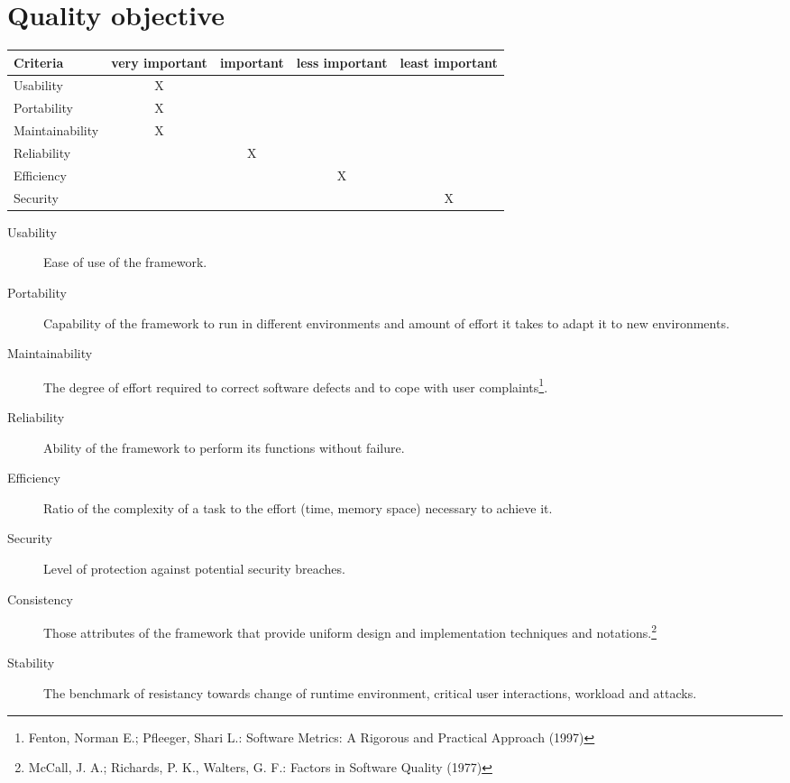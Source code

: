 \section{Quality objective}

\begin{tabular}{lcccc}
\hline
\textbf{Criteria} & \textbf{very important} & \textbf{important} & \textbf{less important} & \textbf{least important} \\
\hline
Usability & X & & & \\
Portability & X & & & \\
Maintainability & X & & & \\
Reliability & & X & & \\
Efficiency & & & X & \\
Security & & & & X \\
\hline

\end{tabular}


\begin{description}
	\item[Usability] Ease of use of the framework.
	\item[Portability] Capability of the framework to run in different environments and amount of effort it takes to adapt it to new environments.
	\item[Maintainability] The degree of effort required to correct software defects and to cope with user complaints\footnote{Fenton, Norman E.; Pfleeger, Shari L.: Software Metrics: A Rigorous and Practical Approach (1997)}.
	\item[Reliability] Ability of the framework to perform its functions without failure.
	\item[Efficiency] Ratio of the complexity of a task to the effort (time, memory space) necessary to achieve it.
	\item[Security] Level of protection against potential security breaches.
	\item[Consistency] Those attributes of the framework that provide uniform design and implementation techniques and notations.\footnote{McCall, J. A.; Richards, P. K., Walters, G. F.: Factors in Software Quality (1977)}
	\item[Stability] The benchmark of resistancy towards change of runtime environment, critical user interactions, workload and attacks.
\end{description}